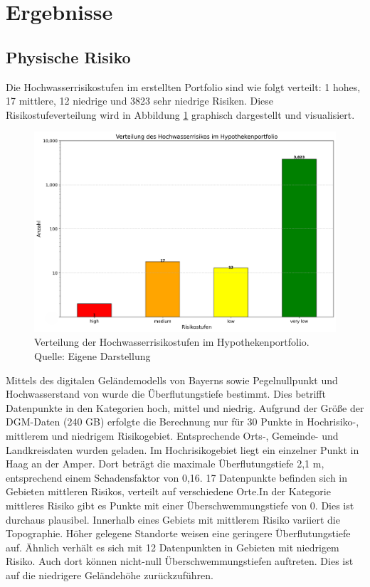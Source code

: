 \section{Ergebnisse}
\subsection{Physische Risiko}
Die Hochwasserrisikostufen im erstellten Portfolio sind wie folgt verteilt: 1 hohes, 17 mittlere, 12 niedrige und 3823 sehr niedrige Risiken. Diese Risikostufeverteilung wird in Abbildung \ref{fig:riskostufe} graphisch dargestellt und visualisiert.
\begin{figure}[htbp]
    \centering
    \includegraphics[width=\textwidth]{figures/hochwasserrisiko_verteilung.png}
    \caption{Verteilung der Hochwasserrisikostufen im Hypothekenportfolio. Quelle: Eigene Darstellung}
    \label{fig:riskostufe}
\end{figure}
\FloatBarrier
Mittels des digitalen Geländemodells von Bayerns sowie Pegelnullpunkt und Hochwasserstand von \textcite{bayern2016hochwassernachrichtendienst} wurde die Überflutungstiefe bestimmt. Dies betrifft Datenpunkte in den Kategorien hoch, mittel und niedrig.
Aufgrund der Größe der \ac{DGM}-Daten (240 GB) erfolgte die Berechnung nur für 30 Punkte in Hochrisiko-, mittlerem und niedrigem Risikogebiet. Entsprechende Orts-, Gemeinde- und Landkreisdaten wurden geladen.
Im Hochrisikogebiet liegt ein einzelner Punkt in Haag an der Amper. Dort beträgt die maximale Überflutungstiefe 2,1 m, entsprechend einem Schadensfaktor von 0,16.
17 Datenpunkte befinden sich in Gebieten mittleren Risikos, verteilt auf verschiedene Orte.In der Kategorie mittleres Risiko gibt es Punkte mit einer Überschwemmungstiefe von 0. Dies ist durchaus plausibel. Innerhalb eines Gebiets mit mittlerem Risiko variiert die Topographie. Höher gelegene Standorte weisen eine geringere Überflutungstiefe auf. Ähnlich verhält es sich mit 12 Datenpunkten in Gebieten mit niedrigem Risiko. Auch dort können nicht-null Überschwemmungstiefen auftreten. Dies ist auf die niedrigere Geländehöhe zurückzuführen. 

